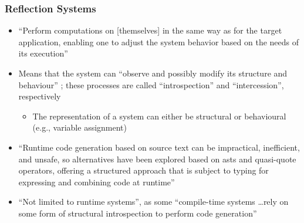 \subsubsection{Reflection Systems \cite[p.~113:7-9]{lilis_survey_2019}}
\begin{itemize}
      \item ``Perform computations on [themselves] in the same way as for the
            target application, enabling one to adjust the system behavior
            based on the needs of its execution''
            \cite[p.~113:7]{lilis_survey_2019}
      \item Means that the system can ``observe and possibly modify its
            structure and behaviour'' \cite[p.~22]{stuikys_taxonomy_2013};
            these processes are called ``introspection'' and ``intercession'',
            respectively \cite[p.~113:7]{lilis_survey_2019}
            \begin{itemize}
                  \item The representation of a system can either be structural
                        or behavioural (e.g., variable assignment)
                        \cite[p.~113:7]{lilis_survey_2019}
            \end{itemize}
      \item ``Runtime code generation based on source text can be impractical,
            inefficient, and unsafe, so alternatives have been explored based
            on \acsp{ast} and quasi-quote operators, offering a structured approach
            that is subject to typing for expressing and combining code at
            runtime'' \cite[p.~113:8]{lilis_survey_2019}
      \item ``Not limited to runtime systems'', as some ``compile-time systems
            \dots rely on some form of structural introspection to perform code
            generation'' \cite[p.~113:9]{lilis_survey_2019}
\end{itemize}

